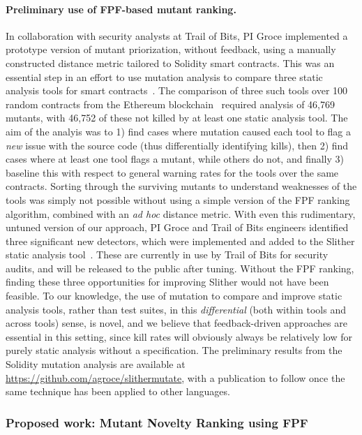 \paragraph{Preliminary use of FPF-based mutant ranking.} In collaboration with security analysts at Trail of Bits, PI Groce
implemented a prototype version of mutant priorization, without
feedback, using a manually constructed distance metric tailored to
Solidity smart contracts.  This was an essential step in an effort to
use mutation analysis to compare three static analysis tools for smart
contracts~\cite{slitherpaper,sc:smartcheck,securify}.  The comparison of three such tools over 100 random contracts
from the Ethereum blockchain~\cite{buterin2013whitepaper,wood2014yellow} required analysis of 46,769 mutants, with
46,752 of these not killed by at least one static analysis tool.  The
aim of the analyis was to 1) find cases where mutation caused each
tool to flag a \emph{new} issue with the source code (thus
differentially identifying kills), then 2) find cases where at
least one tool flags a mutant, while others do not, and finally 3) baseline
this with respect to general warning rates for the tools over the same contracts.
Sorting through the surviving mutants to understand weaknesses of the
tools was simply not possible without using a simple version of the
FPF ranking algorithm, combined with an \emph{ad hoc} distance
metric.  With even this rudimentary, untuned version of our approach,
PI Groce and Trail of Bits engineers identified three significant new
detectors, which were implemented and added to the Slither static
analysis tool~\cite{slitherpaper}.  These are currently in use by Trail of Bits for
security audits, and will be released to the public after tuning.  Without the FPF ranking, finding these three
opportunities for improving Slither would not have been feasible.  To
our knowledge, the use of mutation to compare and improve static
analysis tools, rather than test suites, in this \emph{differential}
(both within tools and across tools) sense, is novel, and we believe that
feedback-driven approaches are essential in this setting, since kill
rates will obviously always be relatively low for purely static
analysis without a specification.  The preliminary results from the
Solidity mutation analysis are available at
\url{https://github.com/agroce/slithermutate}, with a publication to
follow once the same technique has been applied to other languages.

\subsubsection{Proposed work: Mutant Novelty Ranking using FPF} 

